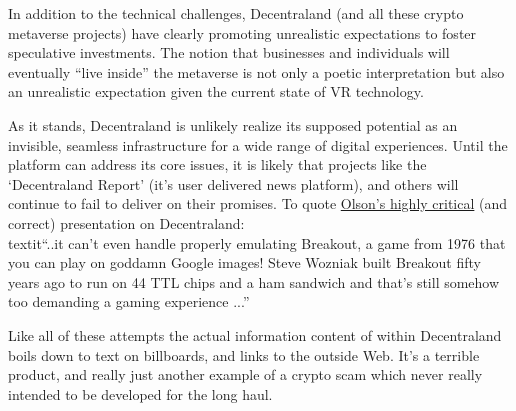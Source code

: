 In addition to the technical challenges, Decentraland (and all these crypto metaverse projects) have clearly promoting unrealistic expectations to foster speculative investments. The notion that businesses and individuals will eventually ``live inside'' the metaverse is not only a poetic interpretation but also an unrealistic expectation given the current state of VR technology.\par 
As it stands, Decentraland is unlikely realize its supposed potential as an invisible, seamless infrastructure for a wide range of digital experiences. Until the platform can address its core issues, it is likely that projects like the `Decentraland Report' (it's user delivered news platform), and others will continue to fail to deliver on their promises. To quote \href{https://www.youtube.com/watch?v=EiZhdpLXZ8Q}{Olson's highly critical} (and correct) presentation on Decentraland: \\textit{``..it can’t even handle properly emulating Breakout, a game from 1976 that you can play on goddamn Google images! Steve Wozniak built Breakout fifty years ago to run on 44 TTL chips and a ham sandwich and that’s still somehow too demanding a gaming experience ...''}\par
Like all of these attempts the actual information content of within Decentraland boils down to text on billboards, and links to the outside Web. It's a terrible product, and really just another example of a crypto scam which never really intended to be developed for the long haul. 

